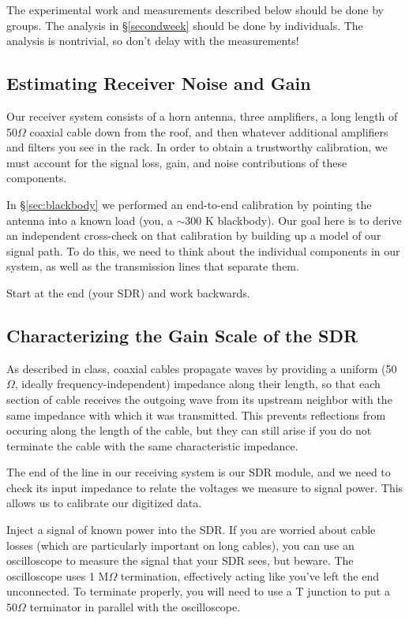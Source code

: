 \documentclass[11pt,preprint]{aastex}
\begin{document}
The experimental work and measurements described below should
be done by groups.  The analysis in \S \ref{secondweek} should be done
by individuals. The analysis is nontrivial, so don't delay with the
measurements!


\subsection{Estimating Receiver Noise and Gain}

\noindent
Our receiver system consists of a horn antenna, three amplifiers,
a long length of 50$\Omega$
coaxial cable down from the roof, and then whatever additional amplifiers and 
filters you see in the rack. In order to obtain a trustworthy calibration,
we must account for the signal loss, gain, and noise
contributions of these components.

In \S\ref{sec:blackbody} we performed an end-to-end calibration by pointing the antenna into
a known load (you, a $\sim$300 K blackbody). Our goal here is to derive an 
independent cross-check on that calibration by building up 
a model of our signal path.
To do this, we need to think about the individual components in our system,
as well as the transmission lines that separate them.

Start at the end (your SDR) and work backwards.

\subsection{Characterizing the Gain Scale of the SDR}
\label{sec:termination}

\noindent
As described in class, coaxial cables propagate waves by
providing a uniform (50$\Omega$, ideally frequency-independent) impedance 
along their length, so that each
section of cable receives the outgoing wave from its upstream neighbor
with the same impedance with which it was transmitted. This prevents reflections
from occuring along the length of the cable, but they can still arise 
if you do not terminate the cable with the same characteristic impedance.

The end of the line in our receiving system is our SDR module, and we need to
check its input impedance to relate the voltages we measure
to signal power. 
This allows us to calibrate our digitized data.

Inject a signal of known power into the SDR. If you are worried about
cable losses (which are particularly important on long cables), you
can use an oscilloscope to measure the signal that your SDR
sees, but beware. The oscilloscope uses 1 M$\Omega$ termination, effectively
acting like you've left the end unconnected. To terminate properly, you will
need to use a T junction to put a $50\Omega$ terminator in parallel with
the oscilloscope.
\end{document}
